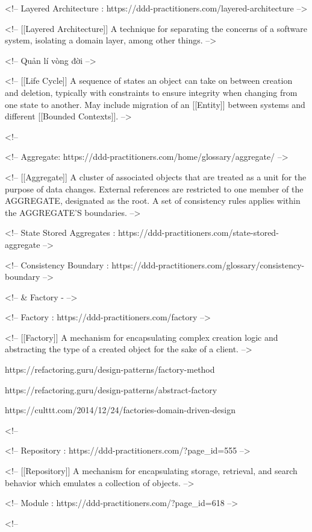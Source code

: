 

<!-- Layered Architecture : https://ddd-practitioners.com/layered-architecture -->

<!-- [[Layered Architecture]] A technique for separating the concerns of a software system, isolating a domain layer, among other things. -->

<!-- Quản lí vòng đời -->

<!-- [[Life Cycle]] A sequence of states an object can take on between creation and deletion, typically with constraints to ensure integrity when changing from one state to another. May include migration of an [[Entity]] between systems and different [[Bounded Contexts]]. -->

<!-- %

<!-- Aggregate: https://ddd-practitioners.com/home/glossary/aggregate/ -->

<!-- [[Aggregate]] A cluster of associated objects that are treated as a unit for the purpose of data changes. External references are restricted to one member of the AGGREGATE, designated as the root. A set of consistency rules applies within the AGGREGATE’S boundaries. -->

<!-- State Stored Aggregates : https://ddd-practitioners.com/state-stored-aggregate -->

<!-- Consistency Boundary : https://ddd-practitioners.com/glossary/consistency-boundary -->

<!-- & Factory - -->

<!-- Factory : https://ddd-practitioners.com/factory -->

<!-- [[Factory]] A mechanism for encapsulating complex creation logic and abstracting the type of a created object for the sake of a client. -->

https://refactoring.guru/design-patterns/factory-method

https://refactoring.guru/design-patterns/abstract-factory

https://culttt.com/2014/12/24/factories-domain-driven-design

<!-- %

<!-- Repository : https://ddd-practitioners.com/?page_id=555 -->

<!-- [[Repository]] A mechanism for encapsulating storage, retrieval, and search behavior which emulates a collection of objects. -->

<!-- Module : https://ddd-practitioners.com/?page_id=618 -->

<!-- %


